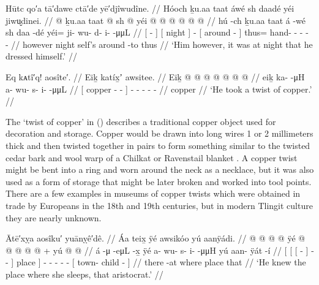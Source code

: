 \ex\label{ex:89-152-dress-at-night}%
%
\begingl
	\glpreamble	Hūtc qo′a tā′dawe ctā′de yē′djîwudîne. //
	\glpreamble	Hóoch ḵu.aa taat áwé sh daadé yéi jiwu̬dinei. //
	\gla	{}  @ {} {} ḵu.aa
		{} taat {}  @ {}
		{} sh  @ {} {}
		yéi @  @ {} @ {} @ {} @ {} @ {} //
	\glb	{} hú -ch {} ḵu.aa
		{} taat {} á -wé
		{} sh daa -dé {}
		yéi= ji- wu- d- i-  -μμL //
	\glc	{}[  - {}] 
		{}[ night {}]  -
		{}[  around - {}]
		thus= hand- - - -  - //
	\gld	{}  {} {} however
		{} night {}  {}
		{} self’s around -to {}
		thus  {} {} {} {} {} //
	\glft	‘Him however, it was at night that he dressed himself.’
		//
\endgl
\xe

\ex\label{ex:89-153-handle-twist-of-copper}%
%
\begingl
	\glpreamble	Eq kᴀtî′q! aosîte′. //
	\glpreamble	Eiḵ katíx̱ʼ awsitee. //
	\gla	{} Eiḵ  @ {} @ {} {}
		 @ {} @ {} @ {} @ {} @ {} //
	\glb	{} eiḵ ka-  -μH {}
		a- wu- s- i-  -μμL //
	\glc	{}[ copper -  - {}]
		- - - -  - //
	\gld	{} copper  {} {} {}
		 {} {} {} {} {} //
	\glft	‘He took a twist of copper.’
		//
\endgl
\xe

\label{note:89-153-twist-of-copper}
The  ‘twist of copper’ in (\lastx) describes a traditional copper object used for decoration and storage.
Copper would be drawn into long wires 1 or 2 millimeters thick and then twisted together in pairs to form something similar to the twisted cedar bark and wool warp of a Chilkat or Ravenstail blanket \parencites{emmons:1908}[349, 445]{de-laguna:1972}[176, 178–179]{emmons:1991}.
A copper twist might be bent into a ring and worn around the neck as a necklace, but it was also used as a form of storage that might be later broken and worked into tool points.
There are a few examples in museums of copper twists which were obtained in trade by Europeans in the 18th and 19th centuries, but in modern Tlingit culture they are nearly unknown.

\ex\label{ex:89-154-handle-twist-of-copper}%
%
\begingl
	\glpreamble	Ātē′xỵa aosîku′ yuānỵê′dê. //
	\glpreamble	Áa teix̱ ÿé awsikóo yú aanÿádi. //
	\gla	{} {} {}  @ {} {}  @ {} @ {} @ {} {} ÿé {}
		 @ {} @ {} @ {} @ {} @ {} +
		{} yú  @ {} @ {} {} //
	\glb	{} {} {} á -μ {}  -eμL -x̱ {} {} ÿé {}
		a- wu- s- i-  -μμH
		{} yú aan- ÿát -í {} //
	\glc	{}[ {}[ {}[  - {}]
			 - - \• {}] place {}]
		- - - -  -
		{}[  town- child - {}] //
	\gld	{} {} {} there -at {}  {} {} \•where {} place {}
		 {} {} {} {} {}
		{} that  {} {} {} //
	\glft	‘He knew the place where she sleeps, that aristocrat.’
		//
\endgl
\xe

